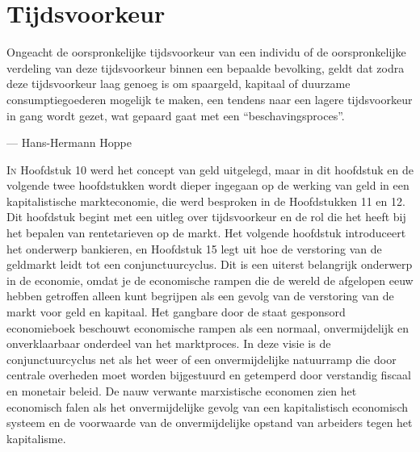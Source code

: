 \hypertarget{tijdsvoorkeur}{%
\chapter{Tijdsvoorkeur}\label{tijdsvoorkeur}}

\begin{blockquotebox}
    Ongeacht de oorspronkelijke tijdsvoorkeur van een individu of de oorspronkelijke verdeling van deze tijdsvoorkeur binnen een bepaalde bevolking, geldt dat zodra deze tijdsvoorkeur laag genoeg is om spaargeld, kapitaal of duurzame consumptiegoederen mogelijk te maken, een tendens naar een lagere tijdsvoorkeur in gang wordt gezet, wat gepaard gaat met een ``beschavingsproces''.\footnotemark
    \par\raggedleft--- Hans-Hermann Hoppe
\end{blockquotebox}

\lettrine{I}n Hoofdstuk 10 werd het concept van geld uitgelegd, maar in dit hoofdstuk en de volgende twee hoofdstukken wordt dieper ingegaan op de werking van geld in een kapitalistische markteconomie, die werd besproken in de Hoofdstukken 11 en 12. Dit hoofdstuk begint met een uitleg over tijdsvoorkeur en de rol die het heeft bij het bepalen van rentetarieven op de markt. Het volgende hoofdstuk introduceert het onderwerp bankieren, en Hoofdstuk 15 legt uit hoe de verstoring van de geldmarkt leidt tot een conjunctuurcyclus. Dit is een uiterst belangrijk onderwerp in de economie, omdat je de economische rampen die de wereld de afgelopen eeuw hebben getroffen alleen kunt begrijpen als een gevolg van de verstoring van de markt voor geld en kapitaal. Het gangbare door de staat gesponsord economieboek beschouwt economische rampen als een normaal, onvermijdelijk en onverklaarbaar onderdeel van het marktproces. In deze visie is de conjunctuurcyclus net als het weer of een onvermijdelijke natuurramp die door centrale overheden moet worden bijgestuurd en getemperd door verstandig fiscaal en monetair beleid. De nauw verwante marxistische economen zien het economisch falen als het onvermijdelijke gevolg van een kapitalistisch economisch systeem en de voorwaarde van de onvermijdelijke opstand van arbeiders tegen het kapitalisme.

